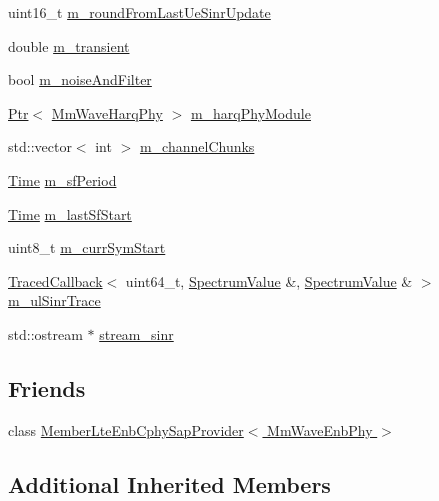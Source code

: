 \begin{DoxyCompactItemize}
uint16\+\_\+t \hyperlink{classns3_1_1MmWaveEnbPhy_a708a523883e45c2b4d369b4367327fd8}{m\+\_\+round\+From\+Last\+Ue\+Sinr\+Update}
\item 
double \hyperlink{classns3_1_1MmWaveEnbPhy_a60467889c9c76cba890f049098f4a822}{m\+\_\+transient}
\item 
bool \hyperlink{classns3_1_1MmWaveEnbPhy_adc49fae3719fbc3f8bfed9b49b04a6c6}{m\+\_\+noise\+And\+Filter}
\item 
\hyperlink{classns3_1_1Ptr}{Ptr}$<$ \hyperlink{classns3_1_1MmWaveHarqPhy}{Mm\+Wave\+Harq\+Phy} $>$ \hyperlink{classns3_1_1MmWaveEnbPhy_aa3e3b7fb0c5994726f3671b0afc51c58}{m\+\_\+harq\+Phy\+Module}
\item 
std\+::vector$<$ int $>$ \hyperlink{classns3_1_1MmWaveEnbPhy_a0aa065c471eb33a7bf9ba6acb966b8ff}{m\+\_\+channel\+Chunks}
\item 
\hyperlink{classns3_1_1Time}{Time} \hyperlink{classns3_1_1MmWaveEnbPhy_a164bffc51f5edf0109f976a874bd3123}{m\+\_\+sf\+Period}
\item 
\hyperlink{classns3_1_1Time}{Time} \hyperlink{classns3_1_1MmWaveEnbPhy_aa928d54402d87640ee61f0c3b5cf2e0c}{m\+\_\+last\+Sf\+Start}
\item 
uint8\+\_\+t \hyperlink{classns3_1_1MmWaveEnbPhy_acabeb79f3613d2a6f8fcd44732e1da1b}{m\+\_\+curr\+Sym\+Start}
\item 
\hyperlink{classns3_1_1TracedCallback}{Traced\+Callback}$<$ uint64\+\_\+t, \hyperlink{classns3_1_1SpectrumValue}{Spectrum\+Value} \&, \hyperlink{classns3_1_1SpectrumValue}{Spectrum\+Value} \& $>$ \hyperlink{classns3_1_1MmWaveEnbPhy_a4a821af3f7946233c2c50831f6f5041a}{m\+\_\+ul\+Sinr\+Trace}
\item 
std\+::ostream $\ast$ \hyperlink{classns3_1_1MmWaveEnbPhy_a7295a3929ce0574f3b4bc5db5aa170af}{stream\+\_\+sinr}
\end{DoxyCompactItemize}
\subsection*{Friends}
\begin{DoxyCompactItemize}
\item 
class \hyperlink{classns3_1_1MmWaveEnbPhy_ac5bd741ead09417b54468f3f868003bc}{Member\+Lte\+Enb\+Cphy\+Sap\+Provider$<$ Mm\+Wave\+Enb\+Phy $>$}
\end{DoxyCompactItemize}
\subsection*{Additional Inherited Members}


